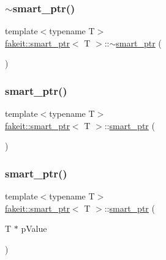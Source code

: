 \subsubsection{\texorpdfstring{$\sim$smart\_ptr()}{~smart\_ptr()}\hspace{0.1cm}{\footnotesize\ttfamily [6/9]}}
{\footnotesize\ttfamily template$<$typename T$>$ \\
\mbox{\hyperlink{classfakeit_1_1smart__ptr}{fakeit\+::smart\+\_\+ptr}}$<$ T $>$\+::$\sim$\mbox{\hyperlink{classfakeit_1_1smart__ptr}{smart\+\_\+ptr}} (\begin{DoxyParamCaption}{ }\end{DoxyParamCaption})\hspace{0.3cm}{\ttfamily [inline]}}

\mbox{\label{classfakeit_1_1smart__ptr_ad718f001e0b0815c80d5cef4f2d4a99a}} 
\subsubsection{\texorpdfstring{smart\_ptr()}{smart\_ptr()}\hspace{0.1cm}{\footnotesize\ttfamily [19/27]}}
{\footnotesize\ttfamily template$<$typename T$>$ \\
\mbox{\hyperlink{classfakeit_1_1smart__ptr}{fakeit\+::smart\+\_\+ptr}}$<$ T $>$\+::\mbox{\hyperlink{classfakeit_1_1smart__ptr}{smart\+\_\+ptr}} (\begin{DoxyParamCaption}{ }\end{DoxyParamCaption})\hspace{0.3cm}{\ttfamily [inline]}}

\mbox{\label{classfakeit_1_1smart__ptr_afa05248e2dceb62a7ecc706700cfd1bf}} 
\subsubsection{\texorpdfstring{smart\_ptr()}{smart\_ptr()}\hspace{0.1cm}{\footnotesize\ttfamily [20/27]}}
{\footnotesize\ttfamily template$<$typename T$>$ \\
\mbox{\hyperlink{classfakeit_1_1smart__ptr}{fakeit\+::smart\+\_\+ptr}}$<$ T $>$\+::\mbox{\hyperlink{classfakeit_1_1smart__ptr}{smart\+\_\+ptr}} (\begin{DoxyParamCaption}\item[{T $\ast$}]{p\+Value }\end{DoxyParamCaption})\hspace{0.3cm}{\ttfamily [inline]}}


